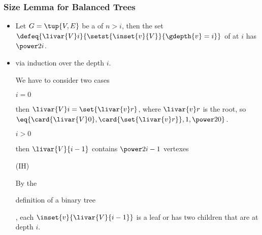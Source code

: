 \begin{module}[id=bbt-size]

\begin{frame}
  \frametitle{Size Lemma for Balanced Trees}
  \begin{itemize}
  \item
    \begin{assertion}[id=size-lemma,type=lemma] 
    Let $G=\tup{V,E}$ be a  
    of $n>i$, then the set
     $\defeq{\livar{V}i}{\setst{\inset{v}{V}}{\gdepth{v} = i}}$ of
     at 
     $i$ has
     $\power2i$.
   \end{assertion}
  \item
    \begin{sproof}[id=size-lemma-pf,proofend=,for=size-lemma]{via induction over the depth $i$.}
      \begin{spfcases}{We have to consider two cases}
        \begin{spfcase}{$i=0$}
          \begin{spfstep}[display=flow]
            then $\livar{V}i=\set{\livar{v}r}$, where $\livar{v}r$ is the root, so
            $\eq{\card{\livar{V}0},\card{\set{\livar{v}r}},1,\power20}$.
          \end{spfstep}
        \end{spfcase}
        \begin{spfcase}{$i>0$}
          \begin{spfstep}[display=flow]
           then $\livar{V}{i-1}$ contains $\power2{i-1}$ vertexes 
           \begin{justification}[method=byIH](IH)\end{justification}
          \end{spfstep}
          \begin{spfstep}
           By the \begin{justification}[method=byDef]definition of a binary
              tree\end{justification}, each $\inset{v}{\livar{V}{i-1}}$ is a leaf or has
            two children that are at depth $i$.
          \end{spfstep}
          \begin{spfstep}

\end{spfstep}
\end{spfcase}
\end{spfcases}
\end{sproof}
\end{itemize}
\end{frame}
\end{module}
